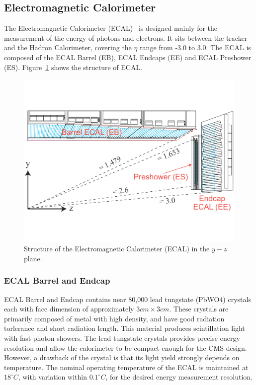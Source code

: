 \subsection{Electromagnetic Calorimeter} 
The Electromagnetic Calorimeter (ECAL)~\cite{lhc_ecaldesign} is designed mainly for the measurement of the energy of photons and electrons. It sits between the tracker and the Hadron Calorimeter, covering the $\eta$ range from -3.0 to 3.0. The ECAL is composed of the ECAL Barrel (EB), ECAL Endcaps (EE) and ECAL Preshower (ES). Figure~\ref{fig:lhc_ecal} shows the structure of ECAL.
\begin{figure}[htbp]
\begin{center}
\includegraphics[width=0.7\linewidth]{figures/lhc_ecal.pdf}
\caption{Structure of the Electromagnetic Calorimeter (ECAL) in the $y-z$ plane.}
\label{fig:lhc_ecal}
\end{center}
\end{figure}

\subsubsection{ECAL Barrel and Endcap}
ECAL Barrel and Endcap contains near 80,000 lead tungstate (PbWO4) crystals each with face dimension of approximately $3cm\times 3cm$. These crystals are primarily composed of metal with high density, and have good radiation torlerance and short radiation length. This material produces scintillation light with fast photon showers. The lead tungstate crystals provides precise energy resolution and allow the calorimeter to be compact enough for the CMS design. However, a drawback of the crystal is that its light yield strongly depends on temperature. The nominal operating temperature of the ECAL is maintained at $18^{\circ}C$, with variation within $0.1^{\circ}C$, for the desired energy measurement resolution. 


